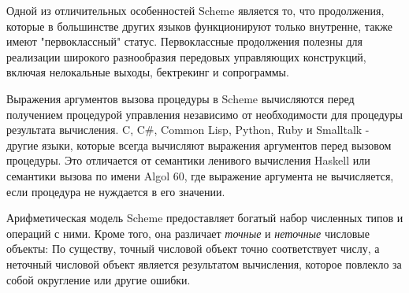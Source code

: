 \vest Одной из отличительных особенностей Scheme является то, что продолжения, которые в
большинстве других языков функционируют только внутренне, также имеют "первоклассный"
статус. Первоклассные продолжения полезны для реализации широкого разнообразия передовых
управляющих конструкций, включая нелокальные выходы, бектрекинг и сопрограммы.


Выражения аргументов вызова процедуры в Scheme вычисляются перед получением процедурой
управления независимо от необходимости для процедуры результата вычисления.
C, C\#, Common Lisp, Python, Ruby и Smalltalk - другие языки, которые всегда вычисляют выражения
аргументов перед вызовом процедуры. Это отличается от семантики ленивого вычисления Haskell или
семантики вызова по имени Algol 60, где выражение аргумента не вычисляется, если процедура не
нуждается в его значении.\vspace{1mm}

Арифметическая модель Scheme предоставляет богатый набор численных типов и операций с
ними. Кроме того, она различает \textit{точные} и \textit{неточные} числовые объекты: По
существу, точный числовой объект точно соответствует числу, а неточный числовой объект является
результатом вычисления, которое повлекло за собой округление или другие ошибки.\vspace{1mm}


